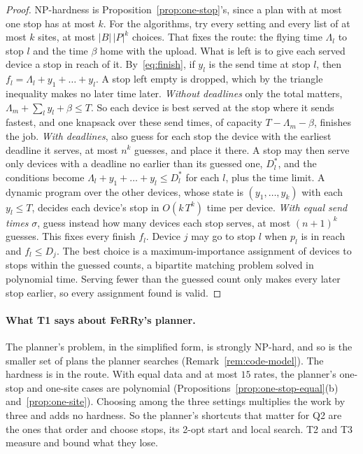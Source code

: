 \begin{proof}
NP-hardness is Proposition~\ref{prop:one-stop}'s, since a plan with at most
one stop has at most $k$. For the algorithms, try every setting and every
list of at most $k$ sites, at most $|B|\,|P|^k$ choices. That fixes the
route: the flying time $\Lambda_l$ to stop $l$ and the time $\beta$ home
with the upload. What is left is to give each served device a stop in reach
of it. By~\eqref{eq:finish}, if $y_l$ is the send time at stop $l$, then
$f_l=\Lambda_l+y_1+\dots+y_l$.
A stop left empty is dropped, which by the triangle inequality makes no
later time later.
\emph{Without deadlines} only the total matters, $\Lambda_m+\sum_l
y_l+\beta\le T$. So each device is best served at the stop where it sends
fastest, and one knapsack over these send times, of capacity
$T-\Lambda_m-\beta$, finishes the job.
\emph{With deadlines}, also guess for each stop the device with the
earliest deadline it serves, at most $n^k$ guesses, and place it there. A
stop may then serve only devices with a deadline no earlier than its
guessed one, $D^*_l$, and the conditions become
$\Lambda_l+y_1+\dots+y_l\le D^*_l$ for each $l$, plus the time limit. A
dynamic program over the other devices, whose state is $(y_1,\dots,y_k)$
with each $y_l\le T$, decides each device's stop in $O(k\,T^k)$ time per
device.
\emph{With equal send times} $\sigma$, guess instead how many devices each
stop serves, at most $(n+1)^k$ guesses. This fixes every finish $f_l$.
Device $j$ may go to stop $l$ when $p_l$ is in reach and $f_l\le D_j$. The
best choice is a maximum-importance assignment of devices to stops within
the guessed counts, a bipartite matching problem solved in polynomial time.
Serving fewer than the guessed count only makes every later stop earlier,
so every assignment found is valid.
\end{proof}

\paragraph{What T1 says about FeRRy's planner.} The planner's problem, in
the simplified form, is strongly NP-hard, and so is the smaller set of plans
the planner searches (Remark~\ref{rem:code-model}). The hardness is in the
route. With equal data and at most $15$ rates, the planner's one-stop and
one-site cases are polynomial (Propositions~\ref{prop:one-stop-equal}(b)
and~\ref{prop:one-site}). Choosing among the three settings multiplies the
work by three and adds no hardness. So the planner's shortcuts that matter
for Q2 are the ones that order and choose stops, its 2-opt start and local
search. T2 and T3 measure and bound what they lose.
